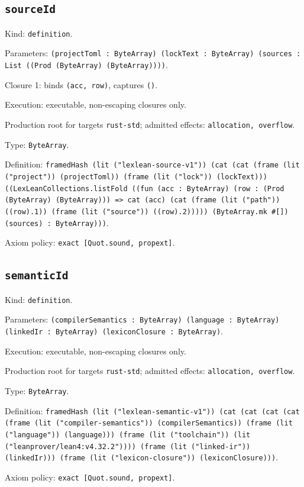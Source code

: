 \documentclass[11pt]{article}
\begin{document}
\subsection*{\texttt{sourceId}}
\noindent Kind: \texttt{definition}.\par
\noindent Parameters: \texttt{(projectToml : ByteArray) (lockText : ByteArray) (sources : List ((Prod (ByteArray) (ByteArray))))}.\par
\noindent Closure 1: binds \texttt{(acc, row)}, captures \texttt{()}.\par
\noindent Execution: executable, non-escaping closures only.\par
\noindent Production root for targets \texttt{rust-std}; admitted effects: \texttt{allocation, overflow}.\par
\noindent Type: \texttt{ByteArray}.\par
\noindent Definition: \texttt{framedHash (lit ("lexlean-source-v1")) (cat (cat (frame (lit ("project")) (projectToml)) (frame (lit ("lock")) (lockText))) ((LexLeanCollections.listFold ((fun (acc : ByteArray) (row : (Prod (ByteArray) (ByteArray))) => cat (acc) (cat (frame (lit ("path")) ((row).1)) (frame (lit ("source")) ((row).2))))) (ByteArray.mk \#[]) (sources) : ByteArray)))}.\par
\noindent Axiom policy: \texttt{exact [Quot.sound, propext]}.\par
\subsection*{\texttt{semanticId}}
\noindent Kind: \texttt{definition}.\par
\noindent Parameters: \texttt{(compilerSemantics : ByteArray) (language : ByteArray) (linkedIr : ByteArray) (lexiconClosure : ByteArray)}.\par
\noindent Execution: executable, non-escaping closures only.\par
\noindent Production root for targets \texttt{rust-std}; admitted effects: \texttt{allocation, overflow}.\par
\noindent Type: \texttt{ByteArray}.\par
\noindent Definition: \texttt{framedHash (lit ("lexlean-semantic-v1")) (cat (cat (cat (cat (frame (lit ("compiler-semantics")) (compilerSemantics)) (frame (lit ("language")) (language))) (frame (lit ("toolchain")) (lit ("leanprover/lean4:v4.32.2")))) (frame (lit ("linked-ir")) (linkedIr))) (frame (lit ("lexicon-closure")) (lexiconClosure)))}.\par
\noindent Axiom policy: \texttt{exact [Quot.sound, propext]}.\par
\end{document}
